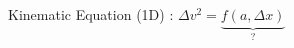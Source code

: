 

\vspace*{\fill}
\centering

Kinematic Equation (1D) : $\Delta v^2 = \underbrace{f(a,\Delta x)}_{?}$

\centering
\vspace*{\fill}

